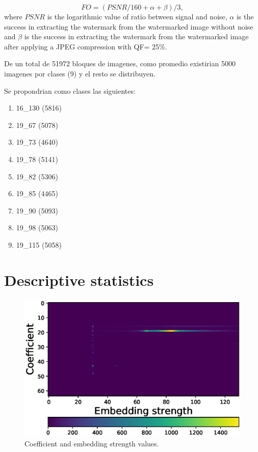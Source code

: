 \documentclass[runningheads]{llncs}
\begin{document}
\begin{equation}
FO = (PSNR/160 + \alpha + \beta)/3,
\label{FA}
\end{equation}
where $PSNR$ is the logarithmic value of ratio between signal and noise, $ \alpha $ is the success in extracting the watermark from the watermarked image without noise and $ \beta $ is the success in extracting the watermark from the watermarked image after applying a JPEG compression with QF= 25{\%}.

De un total de 51972 bloques de imagenes, como promedio existirian 5000 imagenes por clases (9) y el resto se distribuyen.

Se propondrian como clases las siguientes:
\begin{enumerate}
	\item 16\_130 (5816)
	\item 19\_67 (5078)
	\item 19\_73 (4640)
	\item 19\_78 (5141)
	\item 19\_82 (5306)
	\item 19\_85 (4465)
	\item 19\_90 (5093)
	\item 19\_98 (5063)
	\item 19\_115 (5058)
\end{enumerate}

\section{Descriptive statistics}

\begin{figure} [H]
	\begin{center}
		\includegraphics[width=\textwidth]{colormap.eps}
		\caption{Coefficient and embedding strength values.} \label{colormap}
	\end{center}
\end{figure}
\end{document}
